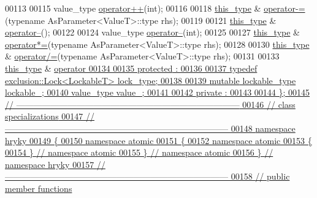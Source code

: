 \begin{DoxyCode}
00113 
00115     value\_type \hyperlink{group__atomic__operation_ga32d8b99a3de61e36c7a0bc7aeb546a0d}{operator++}(\textcolor{keywordtype}{int});
00116 
00118     \hyperlink{classhryky_1_1atomic_1_1_writer_a6b1cad65fb3ef1a993a5eb9e91450aea}{this_type} & \hyperlink{group__atomic__operation_gace0bc7c5e8b6db7afe82e231697672a0}{operator-=}(\textcolor{keyword}{typename} AsParameter<ValueT>::type rhs);
00119 
00121     \hyperlink{classhryky_1_1atomic_1_1_writer_a6b1cad65fb3ef1a993a5eb9e91450aea}{this_type} & \hyperlink{group__atomic__operation_ga6a2f90286d2b8aef610b7ae4cef1f9e7}{operator--}();
00122 
00124     value\_type \hyperlink{group__atomic__operation_ga6a2f90286d2b8aef610b7ae4cef1f9e7}{operator--}(\textcolor{keywordtype}{int});
00125 
00127     \hyperlink{classhryky_1_1atomic_1_1_writer_a6b1cad65fb3ef1a993a5eb9e91450aea}{this_type} & \hyperlink{group__atomic__operation_ga40b0c967eb60601676828001bef4637c}{operator*=}(\textcolor{keyword}{typename} AsParameter<ValueT>::type rhs);
00128 
00130     \hyperlink{classhryky_1_1atomic_1_1_writer_a6b1cad65fb3ef1a993a5eb9e91450aea}{this_type} & \hyperlink{group__atomic__operation_ga1f4841e2995310212eb4762cd3717e6b}{operator/=}(\textcolor{keyword}{typename} AsParameter<ValueT>::type rhs);
00131 
00133     \hyperlink{classhryky_1_1atomic_1_1_writer_a6b1cad65fb3ef1a993a5eb9e91450aea}{this_type} & \hyperlink{group__atomic__operation_ga4dcb98887412fd19c46efb2478f87277}{operator%
00134 
00135 \textcolor{keyword}{protected} :
00136 
00137     \textcolor{keyword}{typedef} \hyperlink{classhryky_1_1exclusion_1_1_lock}{exclusion::Lock<LockableT>} lock\_type;
00138 
00139     \textcolor{keyword}{mutable} lockable\_type   lockable\_;
00140     value\_type              value\_;
00141 
00142 \textcolor{keyword}{private} :
00143 
00144 \};
00145 \textcolor{comment}{//
      ------------------------------------------------------------------------------}
00146 \textcolor{comment}{// class specializations}
00147 \textcolor{comment}{//
      ------------------------------------------------------------------------------}
00148 \textcolor{keyword}{namespace }hryky
00149 \{
00150 \textcolor{keyword}{namespace }atomic
00151 \{
00152 \textcolor{keyword}{namespace }atomic
00153 \{
00154 \} \textcolor{comment}{// namespace atomic}
00155 \} \textcolor{comment}{// namespace atomic}
00156 \} \textcolor{comment}{// namespace hryky}
00157 \textcolor{comment}{//
      ------------------------------------------------------------------------------}
00158 \textcolor{comment}{// public member functions}
}
\end{DoxyCode}
